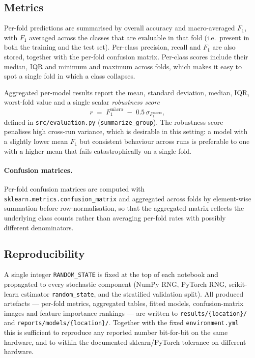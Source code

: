 \subsection{Metrics}

Per-fold predictions are summarised by overall accuracy and macro-averaged $F_1$, with $F_1$ averaged across the classes that are evaluable in that fold (i.e.\ present in both the training and the test set). Per-class precision, recall and $F_1$ are also stored, together with the per-fold confusion matrix. Per-class scores include their median, IQR and minimum and maximum across folds, which makes it easy to spot a single fold in which a class collapses.

Aggregated per-model results report the mean, standard deviation, median, IQR, worst-fold value and a single scalar \emph{robustness score}
\begin{equation}
    r \;=\; \overline{F_1^{\mathrm{macro}}} \;-\; 0.5\,\sigma_{F_1^{\mathrm{macro}}},
    \label{eq:robustness}
\end{equation}
defined in \texttt{src/evaluation.py} (\texttt{summarize\_group}). The robustness score penalises high cross-run variance, which is desirable in this setting: a model with a slightly lower mean $F_1$ but consistent behaviour across runs is preferable to one with a higher mean that fails catastrophically on a single fold.

\paragraph{Confusion matrices.}
Per-fold confusion matrices are computed with \texttt{sklearn.metrics.\allowbreak confusion\_matrix} and aggregated across folds by element-wise summation before row-normalisation, so that the aggregated matrix reflects the underlying class counts rather than averaging per-fold rates with possibly different denominators.

\subsection{Reproducibility}

A single integer \texttt{RANDOM\_STATE} is fixed at the top of each notebook and propagated to every stochastic component (NumPy RNG, PyTorch RNG, scikit-learn estimator \texttt{random\_state}, and the stratified validation split). All produced artefacts — per-fold metrics, aggregated tables, fitted models, confusion-matrix images and feature
importance rankings — are written to \texttt{results/\{location\}/} and \texttt{reports/models/\{location\}/}. Together with the fixed \texttt{environment.yml} this is sufficient to reproduce any reported number bit-for-bit on the same hardware, and to within the documented sklearn/PyTorch tolerance on different hardware.

